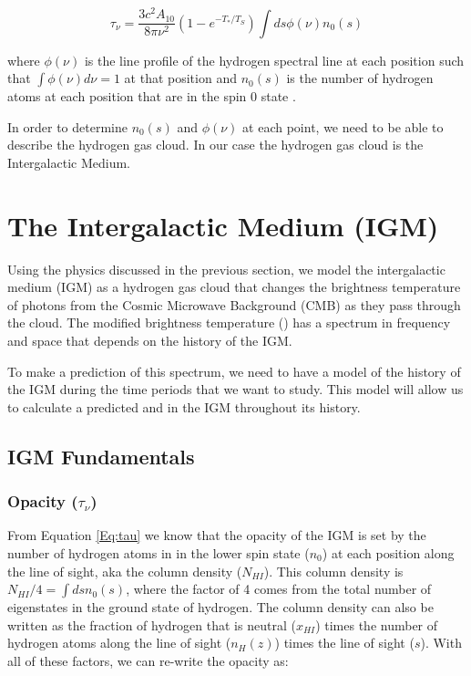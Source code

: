 \begin{equation} \label{Eq:tau}
\tau_{\nu} = \frac{3 c^2 A_{10}}{8 \pi \nu^2 } (1-e^{-T_*/T_S}) \int ds \phi (\nu) n_0(s)
\end{equation}

where $\phi (\nu)$ is the line profile of the hydrogen \cm spectral line at each position such that $\int \phi(\nu) d \nu = 1$ at that position and $n_0 (s)$ is the number of hydrogen atoms at each position that are in the spin 0 state \cite{furlanetto_2006}. 

In order to determine $n_0 (s)$ and $\phi (\nu)$ at each point, we need to be able to describe the hydrogen gas cloud. In our case the hydrogen gas cloud is the Intergalactic Medium. 


\section{The Intergalactic Medium (IGM)}\label{Sec:IGM}
Using the physics discussed in the previous section, we model the intergalactic medium (IGM) as a hydrogen gas cloud that changes the brightness temperature of photons from the Cosmic Microwave Background (CMB) as they pass through the cloud. The modified brightness temperature (\dtb) has a spectrum in frequency and space that depends on the history of the IGM. 

To make a prediction of this spectrum, we need to have a model of the history of the IGM during the time periods that we want to study. This model will allow us to calculate a predicted \ts and \tu in the IGM throughout its history. 

\subsection{IGM Fundamentals}
\subsubsection{Opacity ($\tau_\nu$)}
From Equation \ref{Eq:tau} we know that the opacity of the IGM is set by the number of hydrogen atoms in in the lower spin state ($n_0$) at each position along the line of sight, aka the column density ($N_{HI}$). This column density is $N_{HI}/4 = \int ds n_0 (s)$, where the factor of 4 comes from the total number of eigenstates in the ground state of hydrogen. The column density can also be written as the fraction of hydrogen that is neutral ($x_{HI}$) times the number of hydrogen atoms along the line of sight ($n_H (z)$) times the line of sight ($s$).  
With all of these factors, we can re-write the opacity as:

